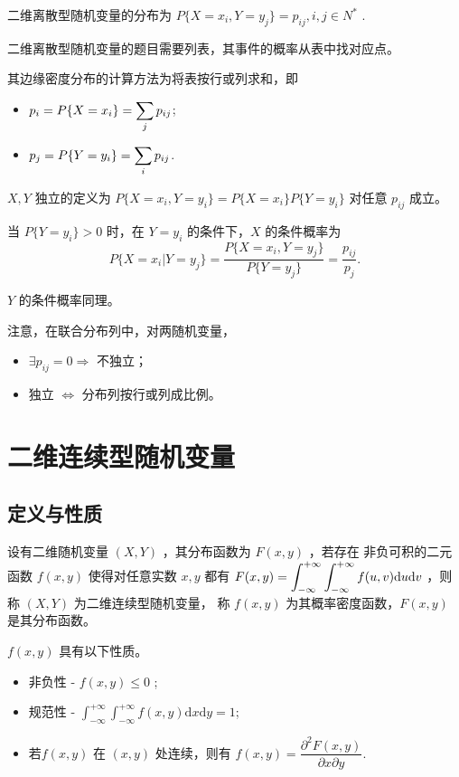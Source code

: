 二维离散型随机变量的分布为 $ P\{X = x_i,Y = y_j\} = p_{ij},i,j\in N^* $ .

二维离散型随机变量的题目需要列表，其事件的概率从表中找对应点。

其边缘密度分布的计算方法为将表按行或列求和，即
\begin{itemize}
    \item $\displaystyle p_i = P\{X = x_i\} = \sum_jp_{ij} $;
    \item $\displaystyle p_j = P\{Y = y_i\} = \sum_ip_{ij} $.
\end{itemize}

$ X,Y $ 独立的定义为 $ P\{X = x_i,Y = y_i\} = P\{X = x_i\}P\{Y = y_i\} $ 对任意 $ p_{ij} $ 成立。

当 $ P\{Y=y_i\}>0 $ 时，在 $ Y = y_i $ 的条件下，$ X $ 的条件概率为
$$
    P\{X = x_i|Y = y_j\} = \dfrac{P\{X = x_i,Y = y_j\}}{P\{Y = y_j\}} = \dfrac{p_{ij}}{p_j}.
$$ 

$ Y $ 的条件概率同理。

注意，在联合分布列中，对两随机变量，\begin{itemize}
    \item $ \exists p_{ij} = 0\Rightarrow $ 不独立；
    \item 独立 $ \Leftrightarrow $ 分布列按行或列成比例。
\end{itemize}

\section{二维连续型随机变量}

\subsection{定义与性质}

\begin{Def}[二维连续型随机变量的概率密度]

    设有二维随机变量 $ (X,Y) $ ，其分布函数为 $ F(x,y) $ ，若存在
    非负可积的二元函数 $ f(x,y) $ 使得对任意实数 $ x,y $ 都有
    $ \displaystyle F(x,y) = \int_{-\infty}^{+\infty}\int_{-\infty}^{+\infty}
    f(u,v)\mathrm{d}u\mathrm{d}v $ ，则称 $ (X,Y) $ 为二维连续型随机变量，
    称 $ f(x,y) $ 为其概率密度函数，$ F(x,y) $ 是其分布函数。
\end{Def}

$ f(x,y) $ 具有以下性质。
\begin{itemize}
    \item 非负性 - $ f(x,y)\leq 0 $ ;
    \item 规范性 - $ \int_{-\infty}^{+\infty}\int_{-\infty}^{+\infty} f(x,y)\mathrm{d}x\mathrm{d}y = 1$;
    \item 若$ f(x,y) $ 在 $ (x,y) $ 处连续，则有 $ f(x,y) = 
    \dfrac{\partial^2 F(x,y)}{\partial x\partial y} $.
\end{itemize}

